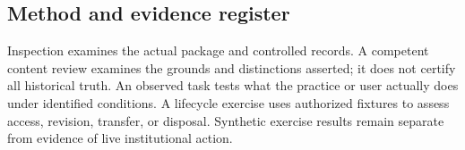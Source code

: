 \documentclass[11pt,a4paper]{article}
\begin{document}
\subsection{Method and evidence register}

Inspection examines the actual package and controlled records. A competent content review examines the grounds and distinctions asserted; it does not certify all historical truth. An observed task tests what the practice or user actually does under identified conditions. A lifecycle exercise uses authorized fixtures to assess access, revision, transfer, or disposal. Synthetic exercise results remain separate from evidence of live institutional action.
\end{document}
